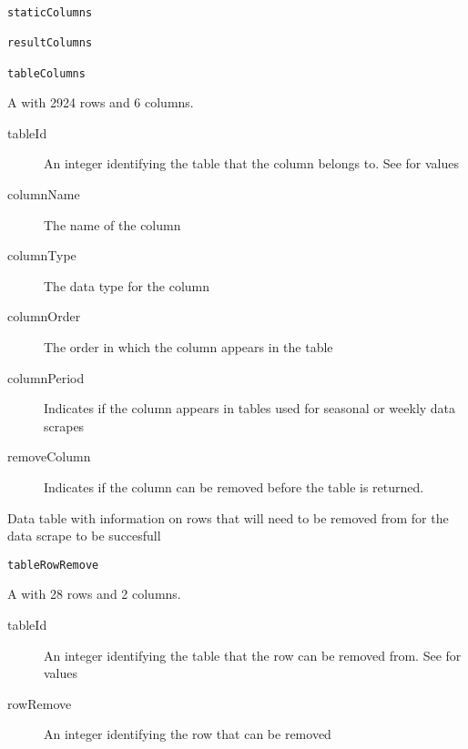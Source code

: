 \documentclass[a4paper]{book}
\begin{document}
%
\begin{Usage}
\begin{verbatim}
staticColumns

resultColumns

tableColumns
\end{verbatim}
\end{Usage}
%
\begin{Format}
A  with 2924 rows and 6 columns.
\begin{description}

\item[tableId] An integer identifying the table that the column belongs to.
See  for values
\item[columnName] The name of the column
\item[columnType] The data type for the column
\item[columnOrder] The order in which the column appears in the table
\item[columnPeriod] Indicates if the column appears in tables used for seasonal
or weekly data scrapes
\item[removeColumn] Indicates if the column can be removed before the table
is returned.

\end{description}
\end{Format}
%
\begin{Description}\relax
Data table with information on rows that will need to be removed from 
for the data scrape to be succesfull
\end{Description}
%
\begin{Usage}
\begin{verbatim}
tableRowRemove
\end{verbatim}
\end{Usage}
%
\begin{Format}
A  with 28 rows and 2 columns.
\begin{description}

\item[tableId] An integer identifying the table that the row can be removed from.
See  for values
\item[rowRemove] An integer identifying the row that can be removed

\end{description}
\end{Format}
\printindex{}
\end{document}
